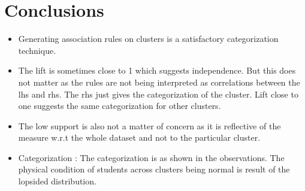 \section*{Conclusions}
\begin{itemize}
\item Generating association rules on clusters is a satisfactory categorization technique. 
\item The lift is sometimes close to 1 which suggests independence. But this does not matter as the rules are not being interpreted as correlations between the lhs and rhs. The rhs just gives the categorization of the cluster. Lift close to one suggests the same categorization for other clusters.
\item The low support is also not a matter of concern as it is reflective of the measure w.r.t the whole dataset and not to the particular cluster.
\item Categorization : The categorization is as shown in the observations. The physical condition of students across clusters being normal is result of the lopsided distribution.
\end{itemize}
